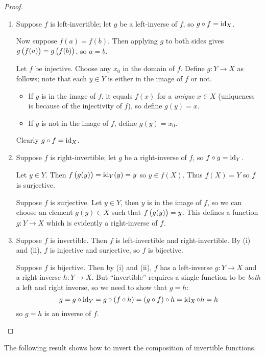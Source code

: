 \begin{proof} \
\begin{enumerate}[label=(\roman*)]
\item \fbox{$\implies$} Suppose $f$ is left-invertible; let $g$ be a left-inverse of $f$, so $g\circ f=\operatorname{id}_X$.

Now suppose $f(a)=f(b)$. Then applying $g$ to both sides gives $g\left(f(a)\right)=g\left(f(b)\right)$, so $a=b$.

\fbox{$\impliedby$} Let $f$ be injective. Choose any $x_0$ in the domain of $f$. Define $g:Y\to X$ as follows; note that each $y\in Y$ is either in the image of $f$ or not.
\begin{itemize}
\item If $y$ is in the image of $f$, it equals $f(x)$ for a \emph{unique} $x\in X$ (uniqueness is because of the injectivity of $f$), so define $g(y)=x$.
\item If $y$ is not in the image of $f$, define $g(y)=x_0$. 
\end{itemize}
Clearly $g\circ f=\operatorname{id}_X$.

\item \fbox{$\implies$} Suppose $f$ is right-invertible; let $g$ be a right-inverse of $f$, so $f\circ g=\operatorname{id}_Y$.

Let $y\in Y$. Then $f\left(g(y)\right)=\operatorname{id}_Y(y)=y$ so $y\in f(X)$. Thus $f(X)=Y$ so $f$ is surjective.

\fbox{$\impliedby$} Suppose $f$ is surjective. Let $y\in Y$, then $y$ is in the image of $f$, so we can choose an element $g(y)\in X$ such that $f\left(g(y)\right)=y$. This defines a function $g:Y\to X$ which is evidently a right-inverse of $f$.

\item \fbox{$\implies$} Suppose $f$ is invertible. Then $f$ is left-invertible and right-invertible. By (i) and (ii), $f$ is injective and surjective, so $f$ is bijective.

\fbox{$\impliedby$} Suppose $f$ is bijective. Then by (i) and (ii), $f$ has a left-inverse $g:Y\to X$ and a right-inverse $h:Y\to X$. But ``invertible'' requires a single function to be \emph{both} a left and right inverse, so we need to show that $g=h$:
\[g=g\circ\operatorname{id}_Y=g\circ(f\circ h)=(g\circ f)\circ h=\operatorname{id}_X\circ h=h\]
so $g=h$ is an inverse of $f$.
\end{enumerate}
\end{proof}

The following result shows how to invert the composition of invertible functions.

